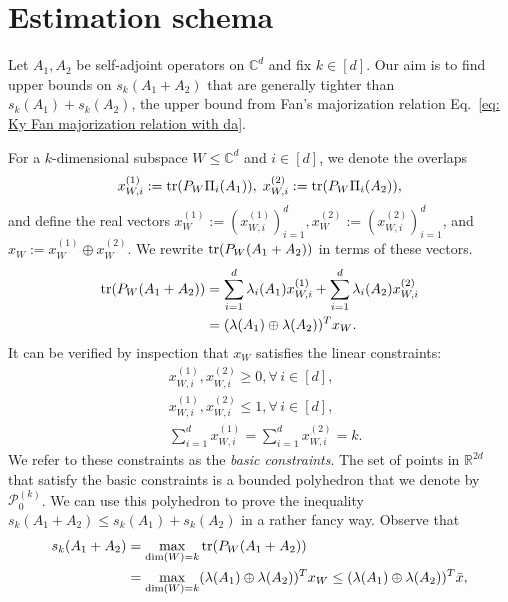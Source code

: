\documentclass[12pt]{article}
\theoremstyle{definition}
\numberwithin{equation}{section}
\numberwithin{equation}{section}
\newcommand{\la}{\lambda}
\newcommand{\cP}{\mathcal{P}}
\newcommand{\bC}{\mathbb{C}}
\newcommand{\bR}{\mathbb{R}}
\begin{document}
\section{Estimation schema}
\label{sec: theory}
Let \(A_1, A_2\) be self-adjoint operators on \(\bC^d\) and fix \(k \in [d]\). Our aim is to find upper bounds on \(s_k(A_1 + A_2)\) that are generally tighter than \(s_k(A_1) + s_k(A_2)\), the upper bound from Fan's majorization relation Eq.~\ref{eq: Ky Fan majorization relation with da}.



For a \(k\)-dimensional subspace \(W \leq \bC^d\) and \(i \in [d]\), we denote the overlaps
\begin{align}
\label{def: overlap var} 
 x^{(1)}_{W,i} := \tr(P_W \Pi_i (A_1)), \;  x^{(2)}_{W,i} := \tr(P_W \Pi_i(A_2)),
\end{align}
and define the real vectors \(x_{W}^{(1)} := (x^{(1)}_{W,i})_{i = 1}^d, x_{W}^{(2)} := (x^{(2)}_{W,i})_{i = 1}^d\), and \(x_W := x^{(1)}_W \oplus x^{(2)}_W\). We rewrite \(\tr(P_W (A_1 + A_2))\) in terms of these vectors.
\begin{equation}
\label{eq: rewriting of tr form}
\begin{aligned}
\tr(P_W (A_1 + A_2)) &= \sum_{i=1}^d \la_i (A_1) x^{(1)}_{W,i} + \sum_{i=1}^d \la_i (A_2) x^{(2)}_{W,i} \\
&= (\la (A_1) \oplus \la(A_2))^T x_W. 
\end{aligned}
\end{equation}
It can be verified by inspection that \(x_W\) satisfies the linear constraints:
\begin{equation}
\begin{aligned}
\label{eq: basic conditions}
&x^{(1)}_{W,i}, x^{(2)}_{W,i} \geq 0, \forall \, i \in [d],\\ 
&x^{(1)}_{W,i}, x^{(2)}_{W,i} \leq 1, \forall \, i \in [d], \\ 
&\sum_{i=1}^d x^{(1)}_{W,i} = \sum_{i=1}^d x^{(2)}_{W,i} = k.
\end{aligned}
\end{equation}
We refer to these constraints as the \textit{basic constraints}. The set of points in \(\bR^{2d}\) that satisfy the basic constraints is a bounded polyhedron that we denote by \(\cP_0^{(k)}\). We can use this polyhedron to prove the inequality \(s_k(A_1+A_2) \leq s_k(A_1) + s_k(A_2)\) in a rather fancy way. Observe that
\begin{align}
\label{eq: estimate for linear form}
s_k (A_1 + A_2) &= \max_{\dim(W) = k} \tr(P_W (A_1 + A_2))\\
&= \max_{\dim(W) = k} (\la (A_1) \oplus \la(A_2))^T x_W \leq (\la (A_1) \oplus \la(A_2))^T \bar{x},
\end{align}
\end{document}
